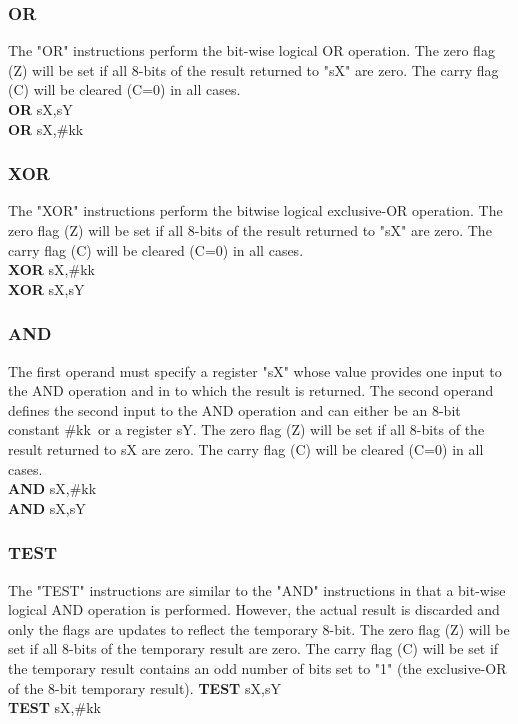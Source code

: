         \subsubsection{OR}
            The "OR" instructions perform the bit-wise logical OR operation.
            The zero flag (Z) will be set if all 8-bits of the result returned to "sX" are zero.
            The carry flag (C) will be cleared (C=0) in all cases.\\
                \textbf{OR} sX,sY\\
                \textbf{OR} sX,\#kk\\

        \subsubsection{XOR}
            The "XOR" instructions perform the bit\-wise logical exclusive-OR operation.
                The zero flag (Z) will be set if all 8-bits of the result returned to "sX" are zero.
            The carry flag (C) will be cleared (C=0) in all cases.\\
                \textbf{XOR} sX,\#kk\\
                \textbf{XOR} sX,sY\\

        \subsubsection{AND}
            The first operand must specify a register "sX" whose value provides one input to the AND operation and in to which the result is returned.
            The second operand defines the second input to the AND operation and can either be an 8-bit constant \#kk\ or a register sY.
            The zero flag (Z) will be set if all 8-bits of the result returned to sX are zero.
            The carry flag (C) will be cleared (C=0) in all cases.\\
                \textbf{AND} sX,\#kk\\
                \textbf{AND} sX,sY\\

        \subsubsection{TEST}
            The "TEST" instructions are similar to the "AND" instructions in that a bit-wise logical AND operation is performed. However, the actual result is discarded and
            only the flags are updates to reflect the temporary 8-bit. The zero flag (Z) will be set if all 8-bits of the temporary result are zero.
            The carry flag (C) will be set if the temporary result contains an odd number of bits set to "1" (the exclusive-OR of the 8-bit temporary result).
                \textbf{TEST} sX,sY\\
                \textbf{TEST} sX,\#kk\\
